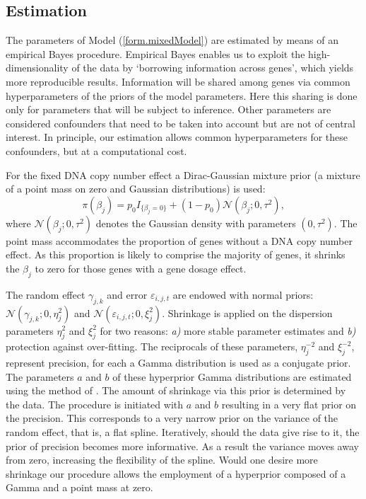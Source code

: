 \subsection{Estimation} \label{estimation}
The parameters of Model (\ref{form.mixedModel}) are estimated by means of an empirical Bayes procedure. Empirical Bayes enables us to exploit the high-dimensionality of the data by `borrowing information across genes', which yields more reproducible results. Information will be shared among genes via common hyperparameters of the priors of the model parameters. Here this sharing is done only for parameters that will be subject to inference. Other parameters are considered confounders that need to be taken into account but are not of central interest. In principle, our estimation allows common hyperparameters for these confounders, but at a computational cost.

For the fixed DNA copy number effect a Dirac-Gaussian mixture prior (a mixture of a point mass on zero and Gaussian distributions) is used:
\[
\pi(\beta_j)=p_0I_{\{\beta_j=0\}} + (1-p_0)\mathcal{N}(\beta_j;0,\tau^2),
\]
where $\mathcal{N}(\beta_j;0,\tau^2)$ denotes the Gaussian density with parameters $(0,\tau^2)$. The point mass accommodates the proportion of genes without a DNA copy number effect. As this proportion is likely to comprise the majority of genes, it shrinks the $\beta_j$ to zero for those genes with a gene dosage effect.

The random effect $\gamma_{j,k}$ and error $\varepsilon_{i,j,t}$ are endowed with normal priors: $\mathcal{N}(\gamma_{j,k};0,\eta_j^2)$ and $\mathcal{N}(\varepsilon_{i,j,t};0,\xi_j^2)$. Shrinkage is applied on the dispersion parameters $\eta_j^{2}$ and $\xi_j^{2}$ for two reasons: \textit{a)} more stable parameter estimates and \textit{b)} protection against over-fitting. The reciprocals of these parameters, $\eta_j^{-2}$ and $\xi_j^{-2}$, represent precision, for each a Gamma distribution is used as a conjugate prior. The parameters $a$ and $b$ of these hyperprior Gamma distributions are estimated using the method of \cite{Mark2013}. The amount of shrinkage via this prior is determined by the data. The procedure is initiated with $a$ and $b$ resulting in a very flat prior on the precision. This corresponds to a very narrow prior on the variance of the random effect, that is, a flat spline. Iteratively, should the data give rise to it, the prior of precision becomes more informative. As a result the variance moves away from zero, increasing the flexibility of the spline. Would one desire more shrinkage our procedure allows the employment of a hyperprior composed of a Gamma and a point mass at zero.


